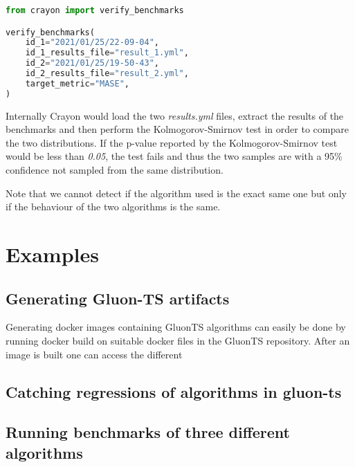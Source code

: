 \begin{lstlisting}[language=Python, label={code:verify}, caption=Python code to verify whether two benchmarks are of the same algorithm.]
from crayon import verify_benchmarks

verify_benchmarks(
    id_1="2021/01/25/22-09-04",
    id_1_results_file="result_1.yml", 
    id_2="2021/01/25/19-50-43",
    id_2_results_file="result_2.yml",
    target_metric="MASE",
)
\end{lstlisting}

Internally Crayon would load the two \textit{results.yml} files, extract the results of the benchmarks and then perform the Kolmogorov-Smirnov test in order to compare the two distributions. If the p-value reported by the Kolmogorov-Smirnov test would be less than \textit{0.05}, the test fails and thus the two samples are with a 95\% confidence not sampled from the same distribution.

Note that we cannot detect if the algorithm used is the exact same one but only if the behaviour of the two algorithms is the same.

\section{Examples}
\subsection{Generating Gluon-TS artifacts}
Generating docker images containing GluonTS algorithms can easily be done by running docker build on suitable docker files in the GluonTS repository. After an image is built one can access the different
\subsection{Catching regressions of algorithms in gluon-ts}
\subsection{Running benchmarks of three different algorithms}